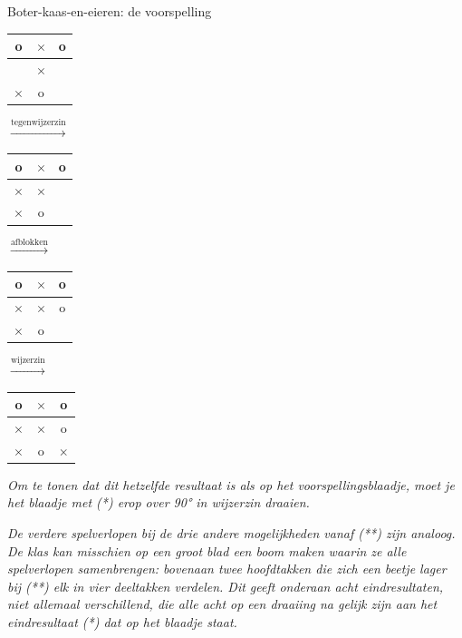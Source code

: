 \begin{lesactiviteit}{Boter-kaas-en-eieren: de voorspelling}
\begin{vraagenantwoord}[resume]
\begin{tabular}{c|c|c}
  o & $\times$ & o \\      \hline
   &  $\times$&  \\      \hline
  $\times$ &  o& 
\end{tabular}
$\xrightarrow{\text{tegenwijzerzin}}$
\begin{tabular}{c|c|c}
  o & $\times$ & o \\      \hline
  $\times$ &  $\times$&  \\      \hline
  $\times$ &  o& 
\end{tabular}
$\xrightarrow{\text{afblokken}}$
\begin{tabular}{c|c|c}
  o & $\times$ & o \\      \hline
  $\times$ &  $\times$& o \\      \hline
  $\times$ &  o& 
\end{tabular}
$\xrightarrow{\text{wijzerzin}}$
\begin{tabular}{c|c|c}
  o & $\times$ & o \\      \hline
  $\times$ &  $\times$& o \\      \hline
  $\times$ &  o& $\times$
\end{tabular}


\emph{Om te tonen dat dit hetzelfde resultaat is als op het voorspellingsblaadje, moet je het blaadje met (*) erop over 90° in wijzerzin draaien.}

\emph{De verdere spelverlopen bij de drie andere mogelijkheden vanaf (**) zijn analoog. De klas kan misschien op een groot blad een boom maken waarin ze alle spelverlopen samenbrengen: bovenaan twee hoofdtakken die zich een beetje lager bij (**) elk in vier deeltakken verdelen. Dit geeft onderaan acht eindresultaten, niet allemaal verschillend, die alle acht op een draaiing na gelijk zijn aan het eindresultaat (*) dat op het blaadje staat.}

\end{vraagenantwoord}

\end{lesactiviteit}\clearpage

